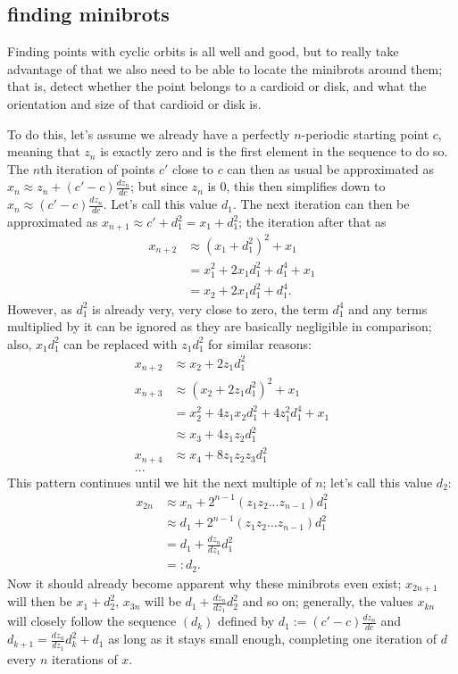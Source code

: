 \documentclass[12pt,a4paper]{article}
\begin{document}
\subsection{finding minibrots}

Finding points with cyclic orbits is all well and good, but to really take advantage of that we also need to be able to locate the minibrots around them; that is, detect whether the point belongs to a cardioid or disk, and what the orientation and size of that cardioid or disk is.

To do this, let's assume we already have a perfectly $n$-periodic starting point $c$, meaning that $z_n$ is exactly zero and is the first element in the sequence to do so. The $n$th iteration of points $c'$ close to $c$ can then as usual be approximated as $x_n\approx z_n+(c'-c)\frac{dz_n}{dc}$; but since $z_n$ is $0$, this then simplifies down to $x_n\approx(c'-c)\frac{dz_n}{dc}$. Let's call this value $d_1$. The next iteration can then be approximated as $x_{n+1}\approx c'+d_1^2=x_1+d_1^2$; the iteration after that as
\begin{align*}
	x_{n+2} &\approx (x_1+d_1^2)^2+x_1\\
	&=x_1^2+2x_1d_1^2+d_1^4+x_1\\
	&=x_2+2x_1d_1^2+d_1^4.
\end{align*}
However, as $d_1^2$ is already very, very close to zero, the term $d_1^4$ and any terms multiplied by it can be ignored as they are basically negligible in comparison; also, $x_1d_1^2$ can be replaced with $z_1d_1^2$ for similar reasons:
\begin{align*}
	x_{n+2} &\approx x_2+2z_1d_1^2\\
	x_{n+3} &\approx (x_2+2z_1d_1^2)^2+x_1\\
	&=x_2^2+4z_1x_2d_1^2+4z_1^2d_1^4+x_1\\
	&\approx x_3+4z_1z_2d_1^2\\
	x_{n+4} &\approx x_4+8z_1z_2z_3d_1^2\\
	...
\end{align*}
This pattern continues until we hit the next multiple of $n$; let's call this value $d_2$:
\begin{align*}
	x_{2n} &\approx x_n+2^{n-1}(z_1z_2...z_{n-1})d_1^2\\
	&\approx d_1+2^{n-1}(z_1z_2...z_{n-1})d_1^2\\
	&=d_1+\frac{dz_n}{dz_1}d_1^2\\
	&=:d_2.
\end{align*}
Now it should already become apparent why these minibrots even exist; $x_{2n+1}$ will then be $x_1+d_2^2$, $x_{3n}$ will be $d_1+\frac{dz_n}{dz_1}d_2^2$ and so on; generally, the values $x_{kn}$ will closely follow the sequence $(d_k)$ defined by $d_1:=(c'-c)\frac{dz_n}{dc}$ and $d_{k+1}=\frac{dz_n}{dz_1}d_k^2+d_1$ as long as it stays small enough, completing one iteration of $d$ every $n$ iterations of $x$.
\end{document}
